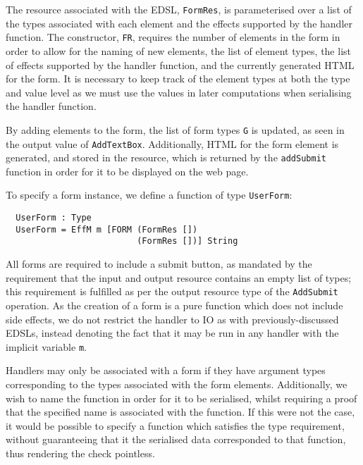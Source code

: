 \documentclass[preprint]{sigplanconf}
\begin{document}
The resource associated with the EDSL, \texttt{FormRes}, is parameterised over a list of the types associated with each element and the effects supported by the handler function. The constructor, \texttt{FR}, requires the number of elements in the form in order to allow for the naming of new elements, the list of element types, the list of effects supported by the handler function, and the currently generated HTML for the form. It is necessary to keep track of the element types at both the type and value level as we must use the values in later computations when serialising the handler function. 

By adding elements to the form, the list of form types \texttt{G} is updated, as seen in the output value of \texttt{AddTextBox}. Additionally, HTML for the form element is generated, and stored in the resource, which is returned by the \texttt{addSubmit} function in order for it to be displayed on the web page.

To specify a form instance, we define a function of type \texttt{UserForm}:
{\small
\begin{verbatim}
  UserForm : Type
  UserForm = EffM m [FORM (FormRes []) 
                          (FormRes [])] String
\end{verbatim}}
All forms are required to include a submit button, as mandated by the requirement that the input and output resource contains an empty list of types; this requirement is fulfilled as per the output resource type of the \texttt{AddSubmit} operation. As the creation of a form is a pure function which does not include side effects, we do not restrict the handler to IO as with previously-discussed EDSLs, instead denoting the fact that it may be run in any handler with the implicit variable \texttt{m}.

Handlers may only be associated with a form if they have argument types corresponding to the types associated with the form elements. Additionally, we wish to name the function in order for it to be serialised, whilst requiring a proof that the specified name is associated with the function. If this were not the case, it would be possible to specify a function which satisfies the type requirement, without guaranteeing that it the serialised data corresponded to that function, thus rendering the check pointless. 
\end{document}
